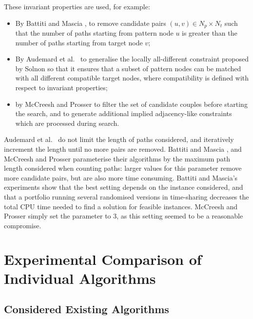 \documentclass{llncs}
\begin{document}
These invariant properties are used, for example:

\begin{itemize}
\item  By Battiti and Mascia \cite{battiti-mascia07}, to remove candidate pairs $(u,v)\in N_p\times
    N_t$ such that the number of paths starting from  pattern node $u$ is greater than the number of
    paths starting from  target node $v$;
\item By Audemard et al.\ \cite{Audemard:2014} to generalise the locally all-different constraint
    proposed by Solnon \cite{Solnon:2010} so that it ensures that a subset of pattern nodes can be
    matched with all different compatible target nodes, where compatibility is defined with respect
    to invariant properties;
\item by McCreesh and Prosser \cite{McCreesh:2015} to filter the set of candidate couples before
    starting the search, and to generate additional implied adjacency-like constraints which are
    processed during search.
\end{itemize}

\noindent Audemard et al.\ \cite{Audemard:2014} do not limit the length of paths considered, and
iteratively increment the length until no more pairs are removed. Battiti and Mascia
\cite{battiti-mascia07}, and McCreesh and Prosser \cite{McCreesh:2015} parameterise their algorithms
by the maximum path length considered when counting paths: larger values for this parameter remove
more candidate pairs, but are also more time consuming. Battiti and Mascia's experiments show that
the best setting depends on the instance considered, and that a portfolio running several randomised
versions in time-sharing decreases the total CPU time needed to find a solution for feasible
instances. McCreesh and Prosser simply set the parameter to 3, as this setting seemed to be a
reasonable compromise.

\section{Experimental Comparison of Individual Algorithms}

\subsection{Considered Existing Algorithms}
\end{document}

